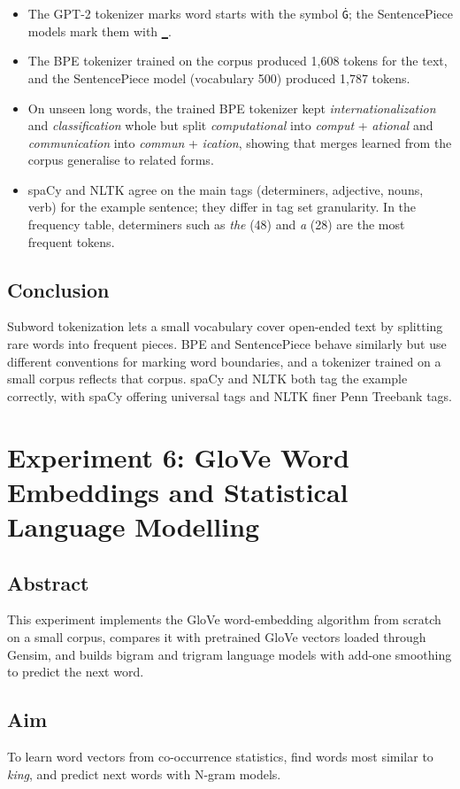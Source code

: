 \documentclass[12pt,a4paper,oneside]{report}
\providecommand{\tightlist}{\setlength{\itemsep}{0pt}\setlength{\parskip}{0pt}}
\begin{document}
\begin{itemize}
\tightlist
\item
  The GPT-2 tokenizer marks word starts with the symbol \texttt{Ġ}; the SentencePiece models mark them with \texttt{▁}.
\item
  The BPE tokenizer trained on the corpus produced 1,608 tokens for the text, and the SentencePiece model (vocabulary 500) produced 1,787 tokens.
\item
  On unseen long words, the trained BPE tokenizer kept \emph{internationalization} and \emph{classification} whole but split \emph{computational} into \emph{comput} + \emph{ational} and \emph{communication} into \emph{commun} + \emph{ication}, showing that merges learned from the corpus generalise to related forms.
\item
  spaCy and NLTK agree on the main tags (determiners, adjective, nouns, verb) for the example sentence; they differ in tag set granularity. In the frequency table, determiners such as \emph{the} (48) and \emph{a} (28) are the most frequent tokens.
\end{itemize}


\section{Conclusion}
Subword tokenization lets a small vocabulary cover open-ended text by splitting rare words into frequent pieces. BPE and SentencePiece behave similarly but use different conventions for marking word boundaries, and a tokenizer trained on a small corpus reflects that corpus. spaCy and NLTK both tag the example correctly, with spaCy offering universal tags and NLTK finer Penn Treebank tags.


\chapter{Experiment 6: GloVe Word Embeddings and Statistical Language Modelling}
\section{Abstract}
This experiment implements the GloVe word-embedding algorithm from scratch on a small corpus, compares it with pretrained GloVe vectors loaded through Gensim, and builds bigram and trigram language models with add-one smoothing to predict the next word.


\section{Aim}
To learn word vectors from co-occurrence statistics, find words most similar to \emph{king}, and predict next words with N-gram models.
\end{document}
